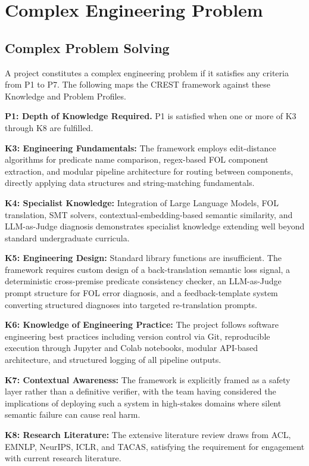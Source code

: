 \section{Complex Engineering Problem}

\subsection{Complex Problem Solving}

A project constitutes a complex engineering problem if it satisfies any criteria from P1 to P7. The following maps the CREST framework against these Knowledge and Problem Profiles.

\textbf{P1: Depth of Knowledge Required.}
P1 is satisfied when one or more of K3 through K8 are fulfilled.

\textbf{K3: Engineering Fundamentals:} The framework employs edit-distance algorithms for predicate name comparison, regex-based FOL component extraction, and modular pipeline architecture for routing between components, directly applying data structures and string-matching fundamentals.

\textbf{K4: Specialist Knowledge:} Integration of Large Language Models, FOL translation, SMT solvers, contextual-embedding-based semantic similarity, and LLM-as-Judge diagnosis demonstrates specialist knowledge extending well beyond standard undergraduate curricula.

\textbf{K5: Engineering Design:} Standard library functions are insufficient. The framework requires custom design of a back-translation semantic loss signal, a deterministic cross-premise predicate consistency checker, an LLM-as-Judge prompt structure for FOL error diagnosis, and a feedback-template system converting structured diagnoses into targeted re-translation prompts.

\textbf{K6: Knowledge of Engineering Practice:} The project follows software engineering best practices including version control via Git, reproducible execution through Jupyter and Colab notebooks, modular API-based architecture, and structured logging of all pipeline outputs.

\textbf{K7: Contextual Awareness:} The framework is explicitly framed as a safety layer rather than a definitive verifier, with the team having considered the implications of deploying such a system in high-stakes domains where silent semantic failure can cause real harm.

\textbf{K8: Research Literature:} The extensive literature review draws from ACL, EMNLP, NeurIPS, ICLR, and TACAS, satisfying the requirement for engagement with current research literature.

